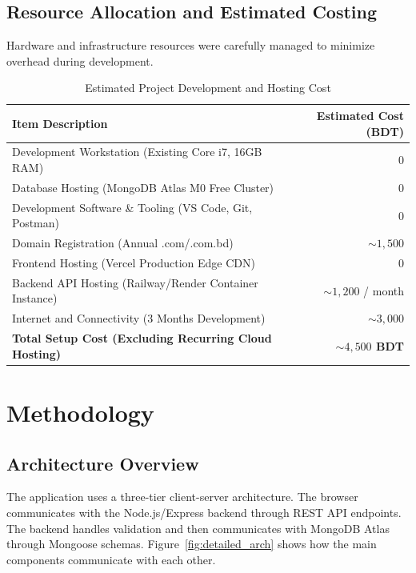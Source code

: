 \documentclass[12pt,a4paper,oneside]{report}
\begin{document}
\section{Resource Allocation and Estimated Costing}
Hardware and infrastructure resources were carefully managed to minimize overhead during development.

\begin{table}[H]
\centering
\caption{Estimated Project Development and Hosting Cost}
\label{tab:costing}
\begin{tabularx}{0.9\textwidth}{Xr}
\toprule
\textbf{Item Description} & \textbf{Estimated Cost (BDT)} \\
\midrule
Development Workstation (Existing Core i7, 16GB RAM) & 0 \\
Database Hosting (MongoDB Atlas M0 Free Cluster) & 0 \\
Development Software \& Tooling (VS Code, Git, Postman) & 0 \\
Domain Registration (Annual .com/.com.bd) & $\sim 1{,}500$ \\
Frontend Hosting (Vercel Production Edge CDN) & 0 \\
Backend API Hosting (Railway/Render Container Instance) & $\sim 1{,}200$ / month \\
Internet and Connectivity (3 Months Development) & $\sim 3{,}000$ \\
\midrule
\textbf{Total Setup Cost (Excluding Recurring Cloud Hosting)} & \textbf{$\sim 4{,}500$ BDT} \\
\bottomrule
\end{tabularx}
\end{table}

\chapter{Methodology}

\section{Architecture Overview}
The application uses a three-tier client-server architecture. The browser communicates with the Node.js/Express backend through REST API endpoints. The backend handles validation and then communicates with MongoDB Atlas through Mongoose schemas. Figure~\ref{fig:detailed_arch} shows how the main components communicate with each other.
\end{document}
